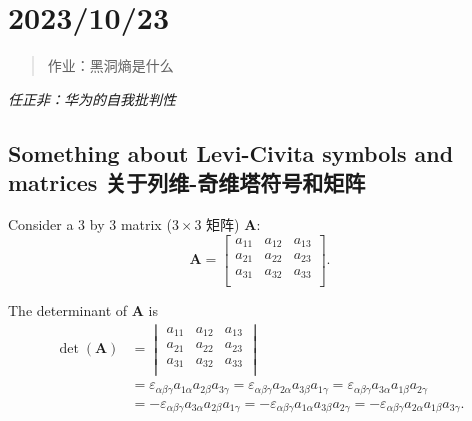 \chapter{2023/10/23}\label{20231023}

\begin{quote}
作业：黑洞熵是什么
\end{quote}

\emph{任正非：华为的自我批判性}

\section{Something about Levi-Civita symbols and matrices
关于列维-奇维塔符号和矩阵}\label{something-about-levi-civita-symbols-and-matrices-ux5173ux4e8eux5217ux7ef4-ux5947ux7ef4ux5854ux7b26ux53f7ux548cux77e9ux9635}

Consider a 3 by 3 matrix (\(3 \times 3\) 矩阵) \(\mathbf A\):
\[\mathbf A = \begin{bmatrix}
    a_{11} & a_{12} & a_{13} \\
    a_{21} & a_{22} & a_{23} \\
    a_{31} & a_{32} & a_{33} \\
\end{bmatrix}.\]

The determinant of \(\mathbf{A}\) is \begin{align*}
    \det (\mathbf A) & = \begin{vmatrix}
        a_{11} & a_{12} & a_{13} \\
        a_{21} & a_{22} & a_{23} \\
        a_{31} & a_{32} & a_{33} \\
    \end{vmatrix} \\
    & = \varepsilon_{\alpha \beta \gamma} a_{1 \alpha} a_{2 \beta} a_{3 \gamma} = \varepsilon_{\alpha \beta \gamma} a_{2 \alpha} a_{3 \beta} a_{1 \gamma} = \varepsilon_{\alpha \beta \gamma} a_{3 \alpha} a_{1 \beta} a_{2 \gamma} \\ 
    & = - \varepsilon_{\alpha \beta \gamma} a_{3 \alpha} a_{2 \beta} a_{1 \gamma} = - \varepsilon_{\alpha \beta \gamma} a_{1 \alpha} a_{3 \beta} a_{2 \gamma} = - \varepsilon_{\alpha \beta \gamma} a_{2 \alpha} a_{1 \beta} a_{3 \gamma}. \\ 
\end{align*}

